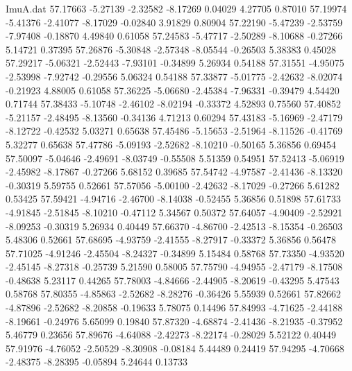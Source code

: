 \begin{filecontents}{ImuA.dat}
  57.17663   -5.27139   -2.32582   -8.17269    0.04029    4.27705    0.87010
  57.19974   -5.41376   -2.41077   -8.17029   -0.02840    3.91829    0.80904
  57.22190   -5.47239   -2.53759   -7.97408   -0.18870    4.49840    0.61058
  57.24583   -5.47717   -2.50289   -8.10688   -0.27266    5.14721    0.37395
  57.26876   -5.30848   -2.57348   -8.05544   -0.26503    5.38383    0.45028
  57.29217   -5.06321   -2.52443   -7.93101   -0.34899    5.26934    0.54188
  57.31551   -4.95075   -2.53998   -7.92742   -0.29556    5.06324    0.54188
  57.33877   -5.01775   -2.42632   -8.02074   -0.21923    4.88005    0.61058
  57.36225   -5.06680   -2.45384   -7.96331   -0.39479    4.54420    0.71744
  57.38433   -5.10748   -2.46102   -8.02194   -0.33372    4.52893    0.75560
  57.40852   -5.21157   -2.48495   -8.13560   -0.34136    4.71213    0.60294
  57.43183   -5.16969   -2.47179   -8.12722   -0.42532    5.03271    0.65638
  57.45486   -5.15653   -2.51964   -8.11526   -0.41769    5.32277    0.65638
  57.47786   -5.09193   -2.52682   -8.10210   -0.50165    5.36856    0.69454
  57.50097   -5.04646   -2.49691   -8.03749   -0.55508    5.51359    0.54951
  57.52413   -5.06919   -2.45982   -8.17867   -0.27266    5.68152    0.39685
  57.54742   -4.97587   -2.41436   -8.13320   -0.30319    5.59755    0.52661
  57.57056   -5.00100   -2.42632   -8.17029   -0.27266    5.61282    0.53425
  57.59421   -4.94716   -2.46700   -8.14038   -0.52455    5.36856    0.51898
  57.61733   -4.91845   -2.51845   -8.10210   -0.47112    5.34567    0.50372
  57.64057   -4.90409   -2.52921   -8.09253   -0.30319    5.26934    0.40449
  57.66370   -4.86700   -2.42513   -8.15354   -0.26503    5.48306    0.52661
  57.68695   -4.93759   -2.41555   -8.27917   -0.33372    5.36856    0.56478
  57.71025   -4.91246   -2.45504   -8.24327   -0.34899    5.15484    0.58768
  57.73350   -4.93520   -2.45145   -8.27318   -0.25739    5.21590    0.58005
  57.75790   -4.94955   -2.47179   -8.17508   -0.48638    5.23117    0.44265
  57.78003   -4.84666   -2.44905   -8.20619   -0.43295    5.47543    0.58768
  57.80355   -4.85863   -2.52682   -8.28276   -0.36426    5.55939    0.52661
  57.82662   -4.87896   -2.52682   -8.20858   -0.19633    5.78075    0.14496
  57.84993   -4.71625   -2.44188   -8.19661   -0.24976    5.65099    0.19840
  57.87320   -4.68874   -2.41436   -8.21935   -0.37952    5.46779    0.23656
  57.89676   -4.64088   -2.42273   -8.22174   -0.28029    5.52122    0.40449
  57.91976   -4.76052   -2.50529   -8.30908   -0.08184    5.44489    0.24419
  57.94295   -4.70668   -2.48375   -8.28395   -0.05894    5.24644    0.13733

\end{filecontents}
